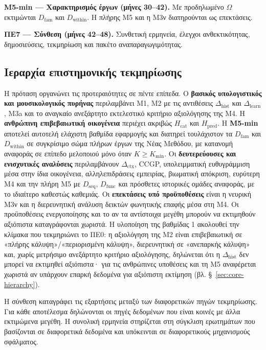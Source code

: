 \documentclass[11pt,a4paper]{article}
\begin{document}
\textbf{M5-min --- Χαρακτηρισμός έργων (μήνες 30--42).} Με προδηλωμένο $\Omega$ εκτιμώνται $D_{\mathrm{fam}}$ και $D_{\mathrm{within}}$. Η πλήρης Μ5 και η M3ν διατηρούνται ως επεκτάσεις.

\textbf{ΠΕ7 --- Σύνθεση (μήνες 42--48).} Συνθετική ερμηνεία, έλεγχοι ανθεκτικότητας, δημοσιεύσεις, τεκμηρίωση και πακέτο αναπαραγωγιμότητας.

\subsection{Ιεραρχία επιστημονικής τεκμηρίωσης}\label{app:impl-evidence}

Η πρόταση οργανώνει τις προτεραιότητες σε πέντε επίπεδα. Ο \textbf{βασικός υπολογιστικός και μουσικολογικός πυρήνας} περιλαμβάνει M1, M2 με τις αντιθέσεις $\Delta_{\mathrm{hist}}$ και $\Delta_{\mathrm{learn}}$, M3a και το αναγκαίο ανεξάρτητο εκτελεστικό κριτήριο αξιολόγησης της M4. Η \textbf{ανθρώπινη επιβεβαιωτική οικογένεια} περιέχει ακριβώς $H_{\mathrm{cat}}$ και $H_{\mathrm{pred}}$. Η \textbf{M5-min} αποτελεί αυτοτελή ελάχιστη βαθμίδα εφαρμογής και διατηρεί τουλάχιστον τα $D_{\mathrm{fam}}$ και $D_{\mathrm{within}}$ σε συγκρίσιμο σώμα πλήρων έργων της Νέας Μεθόδου, με κατανομή αναφοράς σε επίπεδο μελοποιού μόνο όταν $K\ge K_{\min}$. Οι \textbf{δευτερεύουσες και ενισχυτικές αναλύσεις} περιλαμβάνουν $\Delta_{\mathrm{ctx}}$, CCGP, υπολειμματική ευθυγράμμιση μέσα στην ίδια οικογένεια, αλληλεπιδράσεις εμπειρίας, βιωματική απόκριση, ευρύτερη M4 και την πλήρη M5 με $D_{\mathrm{seq}}$, $D_{\mathrm{func}}$ και πρόσθετες ιστορικές ομάδες αναφοράς, με το ιδιαίτερο καθεστώς καθεμιάς. Οι \textbf{επεκτάσεις υπό προϋποθέσεις} είναι η νευρική M3ν και η διερευνητική ανάλυση δεικτών φωνητικής επαφής μέσα στη M4. Οι προϋποθέσεις ενεργοποίησης και το αν τα αντίστοιχα μεγέθη μπορούν να εκτιμηθούν αξιόπιστα καταγράφονται χωριστά. Η υλοποίηση της βαθμίδας 1 ακολουθεί την κλίμακα που τεκμηριώνει το ΠΕ0: η αξιολόγηση της M2 είναι επιβεβαιωτική σε «πλήρης κάλυψη»/«περιορισμένη κάλυψη», διερευνητική σε «ανεπαρκής κάλυψη» και, χωρίς μετρήσιμο ανεξάρτητο κριτήριο αξιολόγησης, δηλώνεται ότι η $\Delta_{\mathrm{hist}}$ δεν μπορεί να εκτιμηθεί αξιόπιστα· για τις ανθρώπινες υποθέσεις και τη M5 αναφέρεται χωριστά αν υπάρχουν επαρκή δεδομένα για αξιόπιστη εκτίμηση (βλ. §~\ref{sec:core-hierarchy}).

Η σύνθεση καταγράφει τις εξαρτήσεις μεταξύ των διαφορετικών πηγών τεκμηρίωσης. Για κάθε αποτέλεσμα δηλώνονται οι πηγές δεδομένων που είναι κοινές με άλλα εκτιμώμενα μεγέθη. Η συνολική ερμηνεία στηρίζεται στη σύγκλιση ερωτημάτων που βασίζονται σε διαφορετικά δεδομένα και υπόκεινται σε διαφορετικούς μηχανισμούς σφάλματος.
\end{document}
